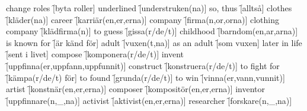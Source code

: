 \begin{questions}
\begin{multicols}{2}
        \question change roles \f[byta roller]
        \question underlined \f[understruken(na)]
        \question so, thus \f[alltså]
        \question clothes \f[kläder(na)]
        \question career \f[karriär(en,er,erna)]
        \question company \f[firma(n,or,orna)]
        \question clothing company \f[klädfirma(n)]
        \question to guess \f[gissa(r/de/t)]
        \question childhood \f[barndom(en,ar,arna)]
        \question is known for \f[är känd för]
        \question adult \f[vuxen(t,na)]
        \question as an adult \f[som vuxen]
        \question later in life \f[sent i livet]
        \question compose \f[komponera(r/de/t)]
        \question invent \f[uppfinna(er,uppfann,uppfunnit)]
        \question construct \f[konstruera(r/de/t)]
        \question to fight for \f[kämpa(r/de/t) för]
        \question to found \f[grunda(r/de/t)]
        \question to win \f[vinna(er,vann,vunnit)]
        \question artist \f[konstnär(en,er,erna)]
        \question composer \f[kompositör(en,er,erna)]
        \question inventor \f[uppfinnare(n,\_,na)]
        \question activist \f[aktivist(en,er,erna)]
        \question researcher \f[forskare(n,\_,na)]
    \end{multicols}
\end{questions}
